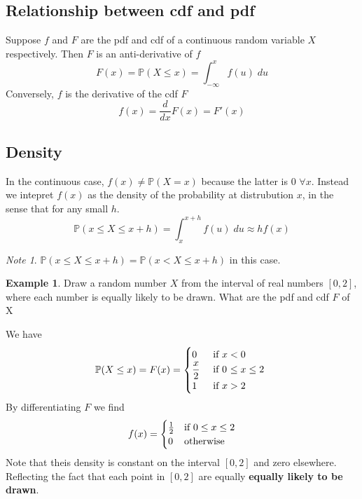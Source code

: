 \documentclass{report}
\theoremstyle{definition}
\newtheorem{example}{Example}
\theoremstyle{plain}
\theoremstyle{remark}
\newtheorem*{note}{Note}
\begin{document}
\subsection{Relationship between cdf and pdf}
Suppose $ f $ and $ F $ are the pdf and cdf of a continuous random variable
$ X $ respectively. Then $ F $ is an anti-derivative of $ f $
$$ F(x) = \mathbb{P} (X \leq x) = \int_{-\infty}^x  f(u) \; du $$
Conversely, $ f $ is the derivative of the cdf $ F $
$$ f(x) = \frac{d}{dx} F(x) = F'(x) $$

\subsection{Density}
In the continuous case, $ f(x) \neq \mathbb{P} (X = x) $ because the latter is
0 $ \forall x $. Instead we intepret $ f(x) $ as the density of the probability
  at distrubution $ x $, in the sense that for any small $ h $. 
  $$ \mathbb{P} (x \leq X \leq x+h)  = \int_x^{x+h}  f(u) \; du \approx h f(x) $$

\begin{note}
  $ \mathbb{P} (x \leq X \leq x + h) = \mathbb{P} (x < X \leq x+h) $ in this
  case.
\end{note}
\begin{example}
  Draw a random number $ X $ from the interval of real numbers $ [0,2] $, where
  each number is equally likely to be drawn. What are the pdf and cdf $ F $ of
  X
\end{example}
We have
\[ \mathbb{P} (X \leq x) = F(x) = 
  \begin{cases}
    0 &\text{ if $ x < 0 $ } \\
    \displaystyle \frac{x}{2} &\text{ if 0 $ \leq x \leq 2 $ } \\
    1 &\text{ if $ x > 2 $}
  \end{cases}\]
  By differentiating $ F $ we find 
  \[ f(x) = \begin{cases}
    \frac{1}{2} &\text{if $ 0 \leq x \leq 2 $}\\
    0 &\text{otherwise}
  \end{cases} \]
  Note that theis density is constant on the interval $ [0,2] $ and zero
  elsewhere. Reflecting the fact that each point in $ [0,2] $ are equally
  \textbf{equally likely to be drawn}.
\end{document}
